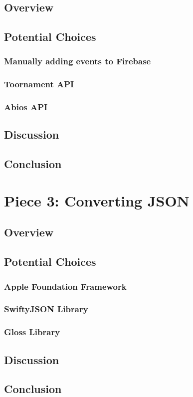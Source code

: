 \documentclass[onecolumn, draftclsnofoot,10pt, compsoc]{IEEEtran}
\begin{document}
\subsection{Overview}
\subsection{Potential Choices}
\subsubsection{Manually adding events to Firebase\cite{fb}}
\subsubsection{Toornament API\cite{toornament}}
\subsubsection{Abios API\cite{abios}}
\subsection{Discussion}
\subsection{Conclusion}

\section{Piece 3: Converting JSON}
\subsection{Overview}
\subsection{Potential Choices}
\subsubsection{Apple Foundation Framework\cite{json}}
\subsubsection{SwiftyJSON Library\cite{sjson}}
\subsubsection{Gloss Library\cite{gloss}}
\subsection{Discussion}
\subsection{Conclusion}



\end{document}
